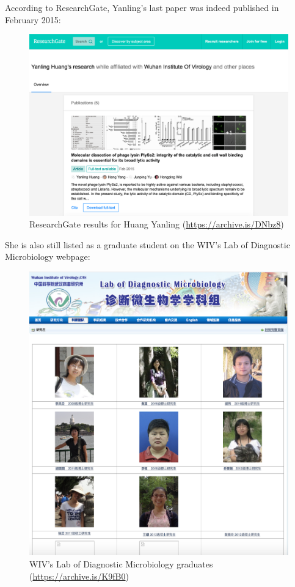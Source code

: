 \documentclass[11pt]{article}
\begin{document}
According to ResearchGate, Yanling’s last paper was indeed published in February 2015:
\begin{figure}[htbp]
\centering
\includegraphics[width=.9\linewidth]{./images/yanling-paper.png}
\caption{ResearchGate results for Huang Yanling (\url{https://archive.is/DNbz8})}
\end{figure}

She is also still listed as a graduate student on the WIV’s Lab of Diagnostic Microbiology webpage:
\begin{figure}[htbp]
\centering
\includegraphics[width=.9\linewidth]{./images/yanling-pic-missing.png}
\caption{WIV’s Lab of Diagnostic Microbiology graduates (\url{https://archive.is/K9fB0})}
\end{figure}
\end{document}
